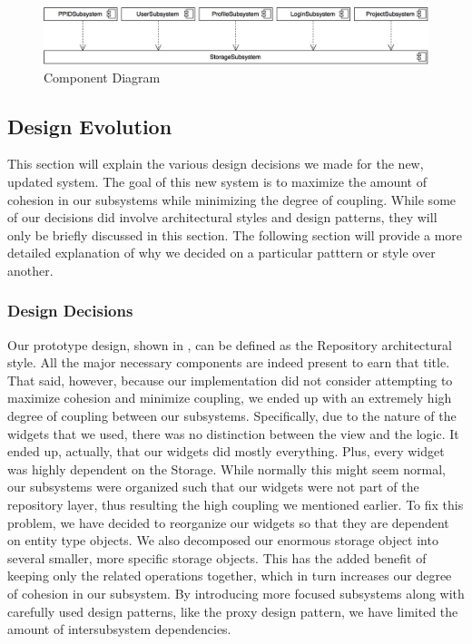 \documentclass[12pt,letterpaper]{article}
\begin{document}
\begin{figure}[H]
	\centering{}
	\includegraphics[scale=0.27]{imgs/d3/decomp/component-diagram.png}
	\caption{Component Diagram}
\end{figure}

\subsection{Design Evolution}

This section will explain the various design decisions we made for the new, updated system. The goal of this new system is to maximize the amount of cohesion in our subsystems while minimizing the degree of coupling. While some of our decisions did involve architectural styles and design patterns, they will only be briefly discussed in this section. The following section will provide a more detailed explanation of why we decided on a particular patttern or style over another.

\subsubsection{Design Decisions}

Our prototype design, shown in , can be defined as the Repository architectural style. All the major necessary components are indeed present to earn that title. That said, however, because our implementation did not consider attempting to maximize cohesion and minimize coupling, we ended up with an extremely high degree of coupling between our subsystems. Specifically, due to the nature of the widgets that we used, there was no distinction between the view and the logic. It ended up, actually, that our widgets did mostly everything. Plus, every widget was highly dependent on the Storage. While normally this might seem normal, our subsystems were organized such that our widgets were not part of the repository layer, thus resulting the high coupling we mentioned earlier. To fix this problem, we have decided to reorganize our widgets so that they are dependent on entity type objects. We also decomposed our enormous storage object into several smaller, more specific storage objects. This has the added benefit of keeping only the related operations together, which in turn increases our degree of cohesion in our subsystem. By introducing more focused subsystems along with carefully used design patterns, like the proxy design pattern, we have limited the amount of intersubsystem dependencies.
\end{document}
